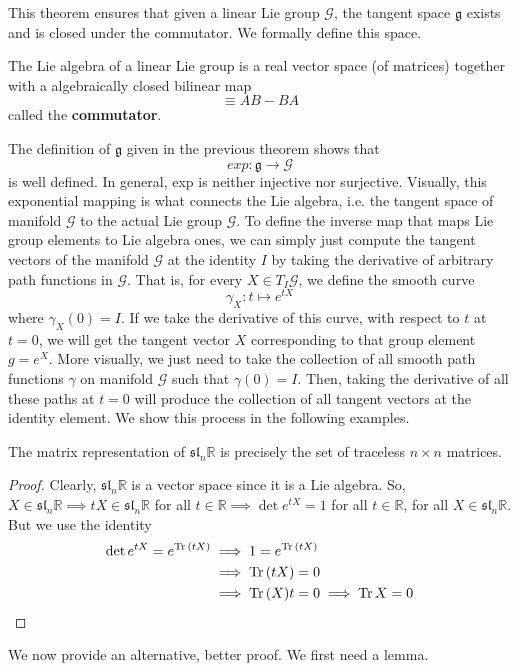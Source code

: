   This theorem ensures that given a linear Lie group $\mathcal{G}$, the tangent space $\mathfrak{g}$ exists and is closed under the commutator. We formally define this space. 

  \begin{definition}
    The Lie algebra of a linear Lie group is a real vector space (of matrices) together with a algebraically closed bilinear map 
    \begin{equation}
      [A,B] \equiv A B - B A
    \end{equation}
    called the \textbf{commutator}. 
  \end{definition} 

  The definition of $\mathfrak{g}$ given in the previous theorem shows that 
  \begin{equation}
    exp: \mathfrak{g} \longrightarrow \mathcal{G}
  \end{equation}
  is well defined. In general, exp is neither injective nor surjective. Visually, this exponential mapping is what connects the Lie algebra, i.e. the tangent space of manifold $\mathcal{G}$ to the actual Lie group $\mathcal{G}$. To define the inverse map that maps Lie group elements to Lie algebra ones, we can simply just compute the tangent vectors of the manifold $\mathcal{G}$ at the identity $I$ by taking the derivative of arbitrary path functions in $\mathcal{G}$. That is, for every $X \in T_I \mathcal{G}$, we define the smooth curve 
  \begin{equation}
    \gamma_X: t \mapsto e^{tX}
  \end{equation}
  where $\gamma_X(0) = I$. If we take the derivative of this curve, with respect to $t$ at $t = 0$, we will get the tangent vector $X$ corresponding to that group element $g = e^{X}$. More visually, we just need to take the collection of all smooth path functions $\gamma$ on manifold $\mathcal{G}$ such that $\gamma(0) = I$. Then, taking the derivative of all these paths at $t = 0$ will produce the collection of all tangent vectors at the identity element. We show this process in the following examples. 

  \begin{theorem}
    The matrix representation of $\mathfrak{sl}_n \mathbb{R}$ is precisely the set of traceless $n \times n$ matrices. 
  \end{theorem}

  \begin{proof}
    Clearly, $\mathfrak{sl}_n \mathbb{R}$ is a vector space since it is a Lie algebra. So, $X \in \mathfrak{sl}_n \mathbb{R} \implies t X \in \mathfrak{sl}_n \mathbb{R}$ for all $t \in \mathbb{R} \implies \det{e^{tX}} = 1$ for all $t \in \mathbb{R}$, for all $X \in \mathfrak{sl}_n \mathbb{R}$. But we use the identity 
    \begin{align*}
      \det{e^{tX}} = e^{\operatorname{Tr}{(tX)}} & \implies 1 = e^{\operatorname{Tr}{(t X)}} \\
      & \implies \operatorname{Tr}{(tX)} = 0 \\
      & \implies \operatorname{Tr}{(X)} t = 0 \implies \operatorname{Tr}{X} = 0
    \end{align*}
  \end{proof}
  We now provide an alternative, better proof. We first need a lemma. 


